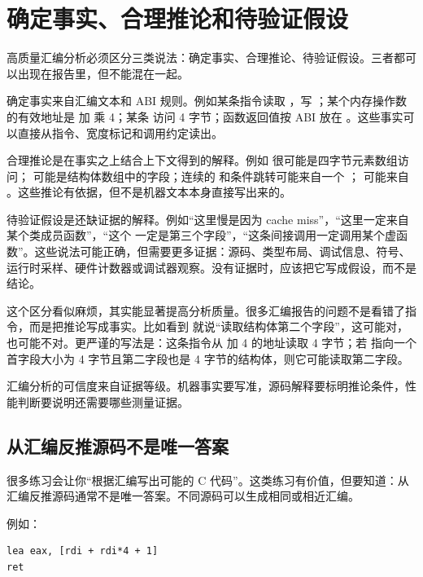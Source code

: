 \section{确定事实、合理推论和待验证假设}

高质量汇编分析必须区分三类说法：确定事实、合理推论、待验证假设。三者都可以出现在报告里，但不能混在一起。

确定事实来自汇编文本和 ABI 规则。例如某条指令读取 ，写 ；某个内存操作数的有效地址是  加  乘 4；某条  访问 4 字节；函数返回值按 ABI 放在 。这些事实可以直接从指令、宽度标记和调用约定读出。

合理推论是在事实之上结合上下文得到的解释。例如  很可能是四字节元素数组访问； 可能是结构体数组中的字段；连续的  和条件跳转可能来自一个 ； 可能来自 。这些推论有依据，但不是机器文本本身直接写出来的。

待验证假设是还缺证据的解释。例如“这里慢是因为 cache miss”，“这里一定来自某个类成员函数”，“这个  一定是第三个字段”，“这条间接调用一定调用某个虚函数”。这些说法可能正确，但需要更多证据：源码、类型布局、调试信息、符号、运行时采样、硬件计数器或调试器观察。没有证据时，应该把它写成假设，而不是结论。

这个区分看似麻烦，其实能显著提高分析质量。很多汇编报告的问题不是看错了指令，而是把推论写成事实。比如看到  就说“读取结构体第二个字段”，这可能对，也可能不对。更严谨的写法是：这条指令从  加 4 的地址读取 4 字节；若  指向一个首字段大小为 4 字节且第二字段也是 4 字节的结构体，则它可能读取第二字段。

\begin{keyidea}
汇编分析的可信度来自证据等级。机器事实要写准，源码解释要标明推论条件，性能判断要说明还需要哪些测量证据。
\end{keyidea}

\subsection{从汇编反推源码不是唯一答案}

很多练习会让你“根据汇编写出可能的 C 代码”。这类练习有价值，但要知道：从汇编反推源码通常不是唯一答案。不同源码可以生成相同或相近汇编。

例如：

\begin{lstlisting}
lea eax, [rdi + rdi*4 + 1]
ret
\end{lstlisting}

